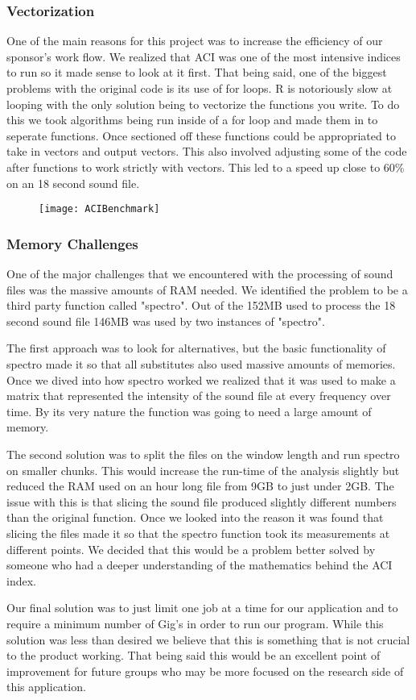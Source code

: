 \subsubsection{Vectorization}
One of the main reasons for this project was to increase the efficiency of our sponsor's work flow. We realized that ACI was one of the most intensive indices to run so it made sense to look at it first. That being said, one of the biggest problems with the original code is its use of for loops. R is notoriously slow at looping with the only solution being to vectorize the functions you write. To do this we took algorithms being run inside of a for loop and made them in to seperate functions. Once sectioned off these functions could be appropriated to take in vectors and output vectors. This also involved adjusting some of the code after functions to work strictly with vectors. This led to a speed up close to 60\% on an 18 second sound file.

\begin{figure}
	\texttt{[image: ACIBenchmark]}
\end{figure}

\subsubsection{Memory Challenges}
One of the major challenges that we encountered with the processing of sound files was the massive amounts of RAM needed. We identified the problem to be a third party function called "spectro". Out of the 152MB used to process the 18 second sound file 146MB was used by two instances of "spectro".\par
The first approach was to look for alternatives, but the basic functionality of spectro made it so that all substitutes also used massive amounts of memories. Once we dived into how spectro worked we realized that it was used to make a matrix that represented the intensity of the sound file at every frequency over time. By its very nature the function was going to need a large amount of memory.\par
The second solution was to split the files on the window length and run spectro on smaller chunks. This would increase the run-time of the analysis slightly but reduced the RAM used on an hour long file from 9GB to just under 2GB. The issue with this is that slicing the sound file produced slightly different numbers than the original function. Once we looked into the reason it was found that slicing the files made it so that the spectro function took its measurements at different points. We decided that this would be a problem better solved by someone who had a deeper understanding of the mathematics behind the ACI index.\par
Our final solution was to just limit one job at a time for our application and to require a minimum number of Gig's in order to run our program. While this solution was less than desired we believe that this is something that is not crucial to the product working. That being said this would be an excellent point of improvement for future groups who may be more focused on the research side of this application.\par
